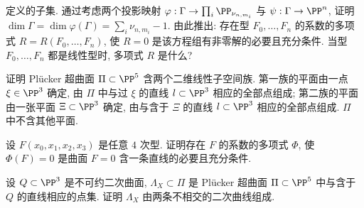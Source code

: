 \begin{compactenum}
\[	\]
	定义的子集. 通过考虑两个投影映射 $\varphi: \Gamma \to \prod_i \PP_{\nu_{n,m_i}}$ 与 $\psi: \Gamma \to \PP^n$, 证明 $\dim \Gamma = \dim \varphi(\Gamma) = \sum_i \nu_{n,m_i} - 1$. 由此推出: 存在型 $F_0, \ldots, F_n$ 的系数的多项式 $R = R(F_0, \ldots, F_n)$, 使 $R = 0$ 是该方程组有非零解的必要且充分条件. 当型 $F_0, \ldots, F_n$ 都是线性型时, 多项式 $R$ 是什么?
	\item 证明 Plücker 超曲面 $\Pi \subset \PP^5$ 含两个二维线性子空间族. 第一族的平面由一点 $\xi \in \PP^3$ 确定, 由 $\Pi$ 中与过 $\xi$ 的直线 $l \subset \PP^3$ 相应的全部点组成; 第二族的平面由一张平面 $\Xi \subset \PP^3$ 确定, 由与含于 $\Xi$ 的直线 $l \subset \PP^3$ 相应的全部点组成. $\Pi$ 中不含其他平面.
	\item 设 $F(x_0, x_1, x_2, x_3)$ 是任意 $4$ 次型. 证明存在 $F$ 的系数的多项式 $\Phi$, 使 $\Phi(F) = 0$ 是曲面 $F = 0$ 含一条直线的必要且充分条件.
	\item 设 $Q \subset \PP^3$ 是不可约二次曲面, $\Lambda_X \subset \Pi$ 是 Plücker 超曲面 $\Pi \subset \PP^5$ 中与含于 $Q$ 的直线相应的点集. 证明 $\Lambda_X$ 由两条不相交的二次曲线组成.
\end{compactenum}
